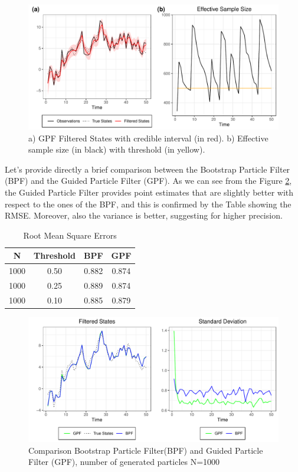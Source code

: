 \documentclass[
]{book}
\theoremstyle{break}
\theoremstyle{nonumberplain}
\begin{document}
\begin{figure}[H]

{\centering \includegraphics{prova_knit_finale_files/figure-latex/unnamed-chunk-15-1} 

}

\caption{a) GPF Filtered States with credible interval (in red). b) Effective sample size (in black) with threshold (in yellow).}\label{fig:unnamed-chunk-15}
\end{figure}

Let's provide directly a brief comparison between the Bootstrap Particle
Filter (BPF) and the Guided Particle Filter (GPF). As we can see from
the Figure \ref{fig:myfig5}, the Guided Particle Filter provides point
estimates that are slightly better with respect to the ones of the BPF,
and this is confirmed by the Table showing the RMSE. Moreover, also the
variance is better, suggesting for higher precision.

\begin{longtable}[t]{cccc}
\caption{\label{tab:unnamed-chunk-17}Root Mean Square Errors}\\
\toprule
N & Threshold & BPF & GPF\\
\midrule
1000 & 0.50 & 0.882 & 0.874\\
1000 & 0.25 & 0.889 & 0.874\\
1000 & 0.10 & 0.885 & 0.879\\
\bottomrule
\end{longtable}

\begin{figure}[H]

{\centering \includegraphics{prova_knit_finale_files/figure-latex/myfig5-1} 

}

\caption{Comparison Bootstrap Particle Filter(BPF) and Guided Particle Filter (GPF), number of generated particles N=1000}\label{fig:myfig5}
\end{figure}
\end{document}
